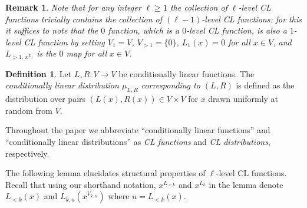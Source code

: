 \documentclass[11pt]{article}
\newtheorem{remark}[theorem]{Remark}
\theoremstyle{definition}
\newtheorem{definition}[theorem]{Definition}
\begin{document}
\begin{remark}
  \label{rk:higher-level}
  Note that for any integer $\ell\geq 1$ the collection of $\ell$-level CL
  functions trivially contains the collection of $(\ell-1)$-level CL functions:
  for this it suffices to note that the $0$ function, which is a $0$-level CL
  function, is also a $1$-level CL function by setting $V_1=V$, $V_{>1}= \{0\}$,
  $L_1(x)=0$ for all $x\in V$, and $L_{>1,\, x^{L_1}}$ is the $0$ map for all
  $x\in V$.
\end{remark}

\begin{definition}
  \label{def:cl-dist}
  Let $L, R: V \to V$ be conditionally linear functions.
  The \emph{conditionally linear distribution $\mu_{L,R}$ corresponding to $(L,
    R)$} is defined as the distribution over pairs $(L(x), R(x)) \in V \times V$
  for $x$ drawn uniformly at random from $V$.
\end{definition}

Throughout the paper we abbreviate ``conditionally linear functions'' and
``conditionally linear distributions'' as \emph{CL functions} and \emph{CL
  distributions}, respectively.

The following lemma elucidates structural properties of $\ell$-level CL
functions.
Recall that using our shorthand notation, $x^{L_{<k}}$ and $x^{L_k}$ in the
lemma denote $L_{<k}(x)$ and $L_{k,u}(x^{V_{k,\, u}})$ where $u = L_{<k}(x)$.
\end{document}
